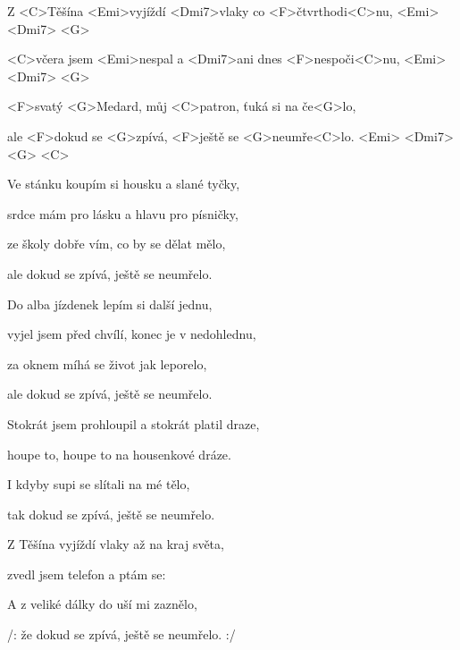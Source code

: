 

\zs
Z <C>Těšína <Emi>vyjíždí <Dmi7>vlaky co <F>čtvrthodi<C>nu, <Emi> <Dmi7> <G>

<C>včera jsem <Emi>nespal a <Dmi7>ani dnes <F>nespoči<C>nu, <Emi> <Dmi7> <G>

<F>svatý <G>Medard, můj <C>patron, ťuká si na če<G>lo,

ale <F>dokud se <G>zpívá, <F>ještě se <G>neumře<C>lo. <Emi> <Dmi7> <G> <C>
\ks

\zs
Ve stánku koupím si housku a slané tyčky,

srdce mám pro lásku a hlavu pro písničky,

ze školy dobře vím, co by se dělat mělo,

ale dokud se zpívá, ještě se neumřelo.
\ks

\zs
Do alba jízdenek lepím si další jednu,

vyjel jsem před chvílí, konec je v nedohlednu,

za oknem míhá se život jak leporelo,

ale dokud se zpívá, ještě se neumřelo.
\ks

\zs
Stokrát jsem prohloupil a stokrát platil draze,

houpe to, houpe to na housenkové dráze.

I kdyby supi se slítali na mé tělo,

tak dokud se zpívá, ještě se neumřelo.
\ks

\zs
Z Těšína vyjíždí vlaky až na kraj světa,

zvedl jsem telefon a ptám se: 

A z veliké dálky do uší mi zaznělo,

/: že dokud se zpívá, ještě se neumřelo. :/
\ks

\kp





